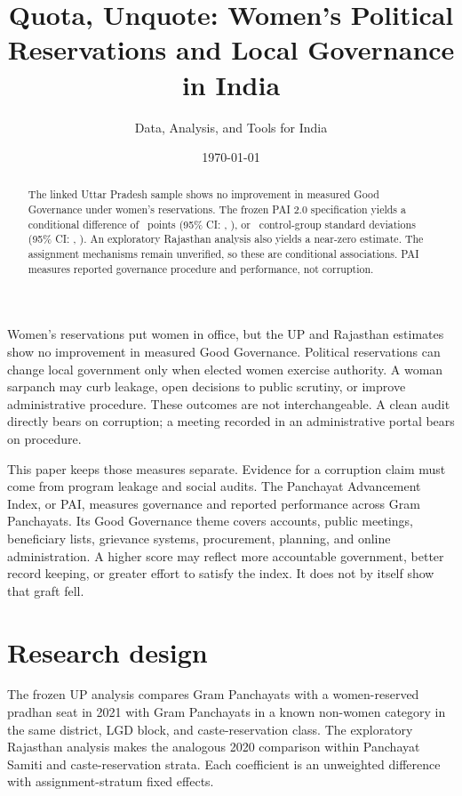 \documentclass[12pt]{article}
\title{Quota, Unquote: Women's Political Reservations and Local Governance in India}
\author{Data, Analysis, and Tools for India}
\date{\today}
\begin{document}



\maketitle

\begin{abstract}
\noindent The linked Uttar Pradesh sample shows no improvement in measured Good Governance under women's reservations. The frozen PAI 2.0 specification yields a conditional difference of \UpPaiTwoDifference\ points (95\% CI: \UpPaiTwoCILow, \UpPaiTwoCIHigh), or \UpPaiTwoDifferenceSD\ control-group standard deviations (95\% CI: \UpPaiTwoCILowSD, \UpPaiTwoCIHighSD). An exploratory Rajasthan analysis also yields a near-zero estimate. The assignment mechanisms remain unverified, so these are conditional associations. PAI measures reported governance procedure and performance, not corruption.
\end{abstract}

\thispagestyle{empty}
\newpage
\doublespacing

Women's reservations put women in office, but the UP and Rajasthan estimates show no improvement in measured Good Governance. Political reservations can change local government only when elected women exercise authority. A woman sarpanch may curb leakage, open decisions to public scrutiny, or improve administrative procedure. These outcomes are not interchangeable. A clean audit directly bears on corruption; a meeting recorded in an administrative portal bears on procedure.

This paper keeps those measures separate. Evidence for a corruption claim must come from program leakage and social audits. The Panchayat Advancement Index, or PAI, measures governance and reported performance across Gram Panchayats. Its Good Governance theme covers accounts, public meetings, beneficiary lists, grievance systems, procurement, planning, and online administration. A higher score may reflect more accountable government, better record keeping, or greater effort to satisfy the index. It does not by itself show that graft fell.

\section{Research design}

The frozen UP analysis compares Gram Panchayats with a women-reserved pradhan seat in 2021 with Gram Panchayats in a known non-women category in the same district, LGD block, and caste-reservation class. The exploratory Rajasthan analysis makes the analogous 2020 comparison within Panchayat Samiti and caste-reservation strata. Each coefficient is an unweighted difference with assignment-stratum fixed effects.
\end{document}
